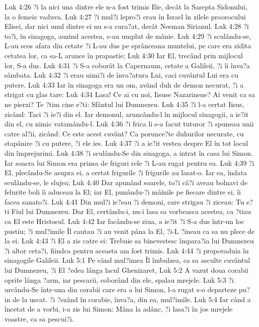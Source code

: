 Luk 4:26  ?i la nici una dintre ele n-a fost trimis Ilie, decât la Sarepta Sidonului, la o femeie vaduva.
Luk 4:27  ?i mul?i lepro?i erau în Israel în zilele proorocului Elisei, dar nici unul dintre ei nu s-a cura?at, decât Neeman Sirianul.
Luk 4:28  ?i to?i, în sinagoga, auzind acestea, s-au umplut de mânie.
Luk 4:29  ?i sculându-se, L-au scos afara din cetate ?i L-au dus pe sprânceana muntelui, pe care era zidita cetatea lor, ca sa-L arunce în prapastie;
Luk 4:30  Iar El, trecând prin mijlocul lor, S-a dus.
Luk 4:31  ?i S-a coborât la Capernaum, cetate a Galileii, ?i îi înva?a sâmbata.
Luk 4:32  ?i erau uimi?i de înva?atura Lui, caci cuvântul Lui era cu putere.
Luk 4:33  Iar în sinagoga era un om, având duh de demon necurat, ?i a strigat cu glas tare:
Luk 4:34  Lasa! Ce ai cu noi, Iisuse Nazarinene? Ai venit ca sa ne pierzi? Te ?tim cine e?ti: Sfântul lui Dumnezeu.
Luk 4:35  ?i l-a certat Iisus, zicând: Taci ?i ie?i din el. Iar demonul, aruncându-l în mijlocul sinagogii, a ie?it din el, cu nimic vatamându-l.
Luk 4:36  ?i frica li s-a facut tuturor ?i spuneau unii catre al?ii, zicând: Ce este acest cuvânt? Ca porunce?te duhurilor necurate, cu stapânire ?i cu putere, ?i ele ies.
Luk 4:37  ?i a ie?it vestea despre El în tot locul din împrejurimi.
Luk 4:38  ?i sculându-Se din sinagoga, a intrat în casa lui Simon. Iar soacra lui Simon era prinsa de friguri rele ?i L-au rugat pentru ea.
Luk 4:39  ?i El, plecându-Se asupra ei, a certat frigurile ?i frigurile au lasat-o. Iar ea, îndata sculându-se, le slujea;
Luk 4:40  Dar apunând soarele, to?i câ?i aveau bolnavi de felurite boli îi aduceau la El; iar El, punându-?i mâinile pe fiecare dintre ei, îi facea sanato?i.
Luk 4:41  Din mul?i ie?eau ?i demoni, care strigau ?i ziceau: Tu e?ti Fiul lui Dumnezeu. Dar El, certându-i, nu-i lasa sa vorbeasca acestea, ca ?tiau ca El este Hristosul.
Luk 4:42  Iar facându-se ziua, a ie?it ?i S-a dus într-un loc pustiu; ?i mul?imile Îl cautau ?i au venit pâna la El, ?i-L ?ineau ca sa nu plece de la ei.
Luk 4:43  ?i El a zis catre ei: Trebuie sa binevestesc împara?ia lui Dumnezeu ?i altor ceta?i, fiindca pentru aceasta am fost trimis.
Luk 4:44  ?i propovaduia în sinagogile Galileii.
Luk 5:1  Pe când mul?imea Îl îmbulzea, ca sa asculte cuvântul lui Dumnezeu, ?i El ?edea lânga lacul Ghenizaret,
Luk 5:2  A vazut doua corabii oprite lânga ?arm, iar pescarii, coborând din ele, spalau mrejele.
Luk 5:3  ?i urcându-Se într-una din corabii care era a lui Simon, l-a rugat s-o departeze pu?in de la uscat. ?i ?ezând în corabie, înva?a, din ea, mul?imile.
Luk 5:4  Iar când a încetat de a vorbi, i-a zis lui Simon: Mâna la adânc, ?i lasa?i în jos mrejele voastre, ca sa pescui?i.
